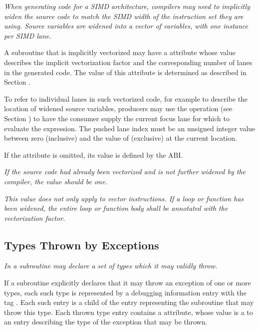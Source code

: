 \textit{When generating code for a SIMD architecture, compilers 
may need to implicitly widen the source code to match the SIMD 
width of the instruction set they are using. Source variables 
are widened into a vector of variables, with one instance per 
SIMD lane.}

A subroutine that is implicitly vectorized may have a 
\DWATnumlanes{} attribute whose value describes the implicit 
vectorization factor and the corresponding number of lanes in 
the generated code. The value of this attribute is determined as 
described in Section .

To refer to individual lanes in such vectorized code, for example 
to describe the location of widened source variables, producers 
may use the \DWOPpushlane{} operation (see Section 
) to have the consumer supply 
the current focus lane for which to evaluate the expression. 
The pushed lane index must be an unsigned integer value between 
zero (inclusive) and the value of \DWATnumlanes{} (exclusive) 
at the current location.

If the attribute is omitted, its value is defined by the ABI.

\textit{If the source code had already been vectorized and is 
not further widened by the compiler, the value should be one.}

\textit{This value does not only apply to vector instructions. 
If a loop or function has been widened, the entire loop or 
function body shall be annotated with the vectorization factor.}
\eb

\subsection{Types Thrown by Exceptions}
\label{chap:typesthrownbyexceptions}

\textit{In  a subroutine may declare a set of types which
it may validly throw.}

If a subroutine explicitly declares that it may throw
an 
exception of one or more types, each such type is
represented by a debugging information entry with 
the tag
\DWTAGthrowntypeTARG.  
Each such entry is a child of the entry
representing the subroutine that may throw this type. Each
thrown type entry contains 
a \DWATtype{} attribute, whose
value is a  
to an entry describing the type of the
exception that may be thrown.

